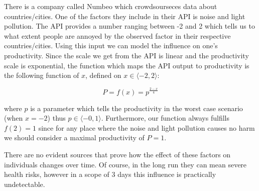 There is a company called Numbeo which crowdsourseces data about countries/cities. One of the factors they include in their API is noise and light pollution. The API provides a number ranging between -2 and 2 which tells us to what extent people are annoyed by the observed factor in their respective countries/cities. Using this input we can model the influence on one's productivity. Since the scale we get from the API is linear and the productivity scale is exponential, the function which maps the API output to productivity is the following function of $x$, defined on $ x\in \langle -2,2\rangle$:

$$P = f(x) = p^{\frac{2-x}{4}}$$

\noindent where $p$ is a parameter which tells the productivity in the worst case scenario  (when $x=-2$) thus $ p\in \langle -0,1\rangle$. Furthermore, our function always fulfills $f(2) = 1$ since for any place where the noise and light pollution causes no harm we should consider a maximal productivity of $P = 1$.


There are no evident sources that prove how the effect of these factors on individuals changes over time. Of course, in the long run they can mean severe health risks, however in a scope of 3 days this influence is practically undetectable.





